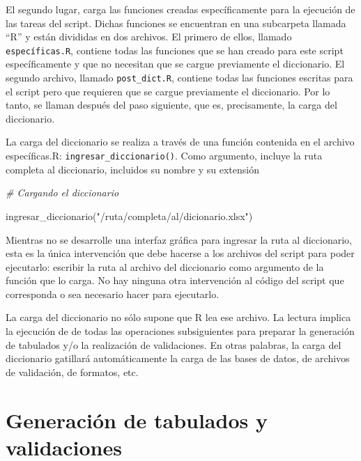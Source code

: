 \documentclass[
  spanish,
]{book}
\newenvironment{Shaded}{\begin{snugshade}}{\end{snugshade}}
\newcommand{\CommentTok}[1]{\textcolor[rgb]{0.56,0.35,0.01}{\textit{#1}}}
\newcommand{\FunctionTok}[1]{\textcolor[rgb]{0.00,0.00,0.00}{#1}}
\newcommand{\NormalTok}[1]{#1}
\newcommand{\StringTok}[1]{\textcolor[rgb]{0.31,0.60,0.02}{#1}}
\begin{document}
El segundo lugar, carga las funciones creadas específicamente para la ejecución de las tareas del script. Dichas funciones se encuentran en una subcarpeta llamada ``R'' y están divididas en dos archivos. El primero de ellos, llamado \texttt{específicas.R}, contiene todas las funciones que se han creado para este script específicamente y que no necesitan que se cargue previamente el diccionario. El segundo archivo, llamado \texttt{post\_dict.R}, contiene todas las funciones escritas para el script pero que requieren que se cargue previamente el diccionario. Por lo tanto, se llaman después del paso siguiente, que es, precisamente, la carga del diccionario.

La carga del diccionario se realiza a través de una función contenida en el archivo específicas.R: \texttt{ingresar\_diccionario()}. Como argumento, incluye la ruta completa al diccionario, incluidos su nombre y su extensión

\begin{Shaded}
\begin{Highlighting}[]
\CommentTok{\# Cargando el diccionario }

\FunctionTok{ingresar\_diccionario}\NormalTok{(}\StringTok{"/ruta/completa/al/dicionario.xlsx"}\NormalTok{)}
\end{Highlighting}
\end{Shaded}

Mientras no se desarrolle una interfaz gráfica para ingresar la ruta al diccionario, esta es la única intervención que debe hacerse a los archivos del script para poder ejecutarlo: escribir la ruta al archivo del diccionario como argumento de la función que lo carga. No hay ninguna otra intervención al código del script que corresponda o sea necesario hacer para ejecutarlo.

La carga del diccionario no sólo supone que R lea ese archivo. La lectura implica la ejecución de de todas las operaciones subsiguientes para preparar la generación de tabulados y/o la realización de validaciones. En otras palabras, la carga del diccionario gatillará automáticamente la carga de las bases de datos, de archivos de validación, de formatos, etc.

\hypertarget{generaciuxf3n-de-tabulados-y-validaciones}{%
\section{Generación de tabulados y validaciones}\label{generaciuxf3n-de-tabulados-y-validaciones}}
\end{document}
